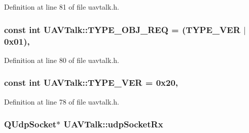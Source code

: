 Definition at line 81 of file uavtalk.\-h.

\hypertarget{group___u_a_v_talk_plugin_ga5e1cb8e2b0aa00f08a16af9c858079e9}{
\subsubsection[{T\-Y\-P\-E\-\_\-\-O\-B\-J\-\_\-\-R\-E\-Q}]{\setlength{\rightskip}{0pt plus 5cm}const {\bf int} U\-A\-V\-Talk\-::\-T\-Y\-P\-E\-\_\-\-O\-B\-J\-\_\-\-R\-E\-Q = (T\-Y\-P\-E\-\_\-\-V\-E\-R $|$ 0x01)\hspace{0.3cm}{\ttfamily [static]}, {\ttfamily [protected]}}}\label{group___u_a_v_talk_plugin_ga5e1cb8e2b0aa00f08a16af9c858079e9}


Definition at line 80 of file uavtalk.\-h.

\hypertarget{group___u_a_v_talk_plugin_gad838c235ec5ef5e1389791d518faa6e7}{
\subsubsection[{T\-Y\-P\-E\-\_\-\-V\-E\-R}]{\setlength{\rightskip}{0pt plus 5cm}const {\bf int} U\-A\-V\-Talk\-::\-T\-Y\-P\-E\-\_\-\-V\-E\-R = 0x20\hspace{0.3cm}{\ttfamily [static]}, {\ttfamily [protected]}}}\label{group___u_a_v_talk_plugin_gad838c235ec5ef5e1389791d518faa6e7}


Definition at line 78 of file uavtalk.\-h.

\hypertarget{group___u_a_v_talk_plugin_ga3fe3d99135440f58cb74fb73a4055ef4}{
\subsubsection[{udp\-Socket\-Rx}]{\setlength{\rightskip}{0pt plus 5cm}Q\-Udp\-Socket$\ast$ U\-A\-V\-Talk\-::udp\-Socket\-Rx\hspace{0.3cm}{\ttfamily [protected]}}}\label{group___u_a_v_talk_plugin_ga3fe3d99135440f58cb74fb73a4055ef4}


